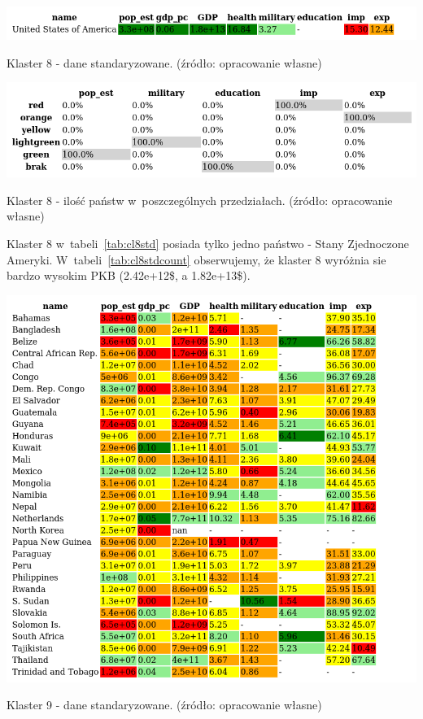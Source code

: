 \documentclass[11pt]{report}
\begin{document}
    \begin{table}[!htp]
        \centering
        \includegraphics[width=\linewidth]{tables/CLUST/cluster8stdkmeans.png}
        \caption{Klaster 8 - dane standaryzowane. (źródło: opracowanie własne)}
        \label{tab:cl8std}
    \end{table}

    \begin{table}[!htp]
        \centering
        \includegraphics[width=\linewidth]{tables/CLUST/cluster8stdkmeanscount.png}
        \caption{Klaster 8 - ilość państw w~poszczególnych przedziałach. (źródło: opracowanie własne)}
        \label{tab:cl8stdcount}
    \end{table}

    Klaster 8 w~tabeli~\ref{tab:cl8std} posiada tylko jedno państwo - Stany Zjednoczone Ameryki.
    W~tabeli~\ref{tab:cl8stdcount} obserwujemy, że klaster 8 wyróżnia sie bardzo wysokim PKB (2.42e+12\$, a 1.82e+13\$).

    \begin{table}[!htp]
        \centering
        \includegraphics[width=\linewidth]{tables/CLUST/cluster9stdkmeans.png}
        \caption{Klaster 9 - dane standaryzowane. (źródło: opracowanie własne)}
        \label{tab:cl9std}
    \end{table}
\end{document}
